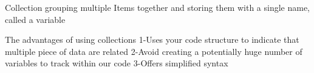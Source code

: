 Collection 
  grouping multiple Items together and storing them with a single name, called a variable 

The advantages of using collections
  1-Uses your code structure to indicate that multiple piece of data are related 
  2-Avoid creating a potentially huge number of variables to track within our code 
  3-Offers simplified syntax
